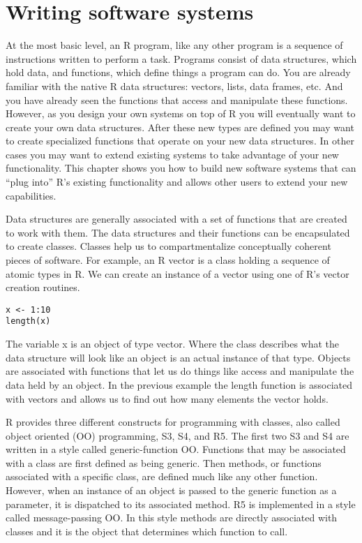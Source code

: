 \chapter{Writing software systems}

At the most basic level, an R program, like any other program is a
sequence of instructions written to perform a task. Programs consist of
data structures, which hold data, and functions, which define things a
program can do. You are already familiar with the native R data
structures: vectors, lists, data frames, etc. And you have already seen
the functions that access and manipulate these functions. However, as
you design your own systems on top of R you will eventually want to
create your own data structures. After these new types are defined you
may want to create specialized functions that operate on your new data
structures. In other cases you may want to extend existing systems to
take advantage of your new functionality. This chapter shows you how to
build new software systems that can ``plug into'' R's existing
functionality and allows other users to extend your new capabilities.

Data structures are generally associated with a set of functions that
are created to work with them. The data structures and their functions
can be encapsulated to create classes. Classes help us to
compartmentalize conceptually coherent pieces of software. For example,
an R vector is a class holding a sequence of atomic types in R. We can
create an instance of a vector using one of R's vector creation
routines.

\begin{verbatim}
x <- 1:10
length(x)
\end{verbatim}

The variable x is an object of type vector. Where the class describes
what the data structure will look like an object is an actual instance
of that type. Objects are associated with functions that let us do
things like access and manipulate the data held by an object. In the
previous example the length function is associated with vectors and
allows us to find out how many elements the vector holds.

R provides three different constructs for programming with classes, also
called object oriented (OO) programming, S3, S4, and R5. The first two
S3 and S4 are written in a style called generic-function OO. Functions
that may be associated with a class are first defined as being generic.
Then methods, or functions associated with a specific class, are defined
much like any other function. However, when an instance of an object is
passed to the generic function as a parameter, it is dispatched to its
associated method. R5 is implemented in a style called message-passing
OO. In this style methods are directly associated with classes and it is
the object that determines which function to call.


